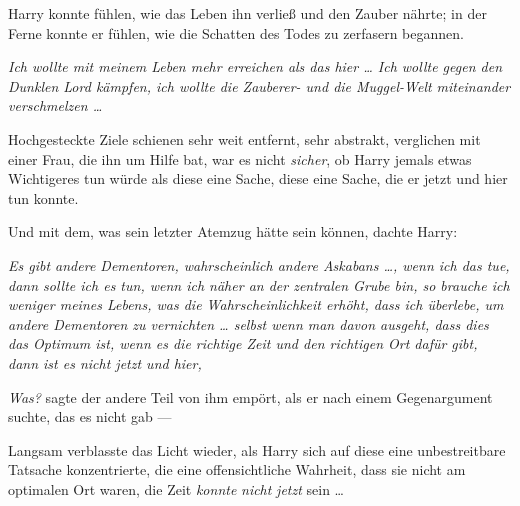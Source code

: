 Harry konnte fühlen, wie das Leben ihn verließ und den Zauber nährte; in der Ferne konnte er fühlen, wie die Schatten des Todes zu zerfasern begannen.

\emph{Ich wollte mit meinem Leben mehr erreichen als das hier … Ich wollte gegen den Dunklen Lord kämpfen, ich wollte die Zauberer- und die Muggel-Welt miteinander verschmelzen …}

Hochgesteckte Ziele schienen sehr weit entfernt, sehr abstrakt, verglichen mit einer Frau, die ihn um Hilfe bat, war es nicht \emph{sicher}, ob Harry jemals etwas Wichtigeres tun würde als diese eine Sache, diese eine Sache, die er jetzt und hier tun konnte.

Und mit dem, was sein letzter Atemzug hätte sein können, dachte Harry:

\emph{Es gibt andere Dementoren, wahrscheinlich andere Askabans …, wenn ich das tue, dann sollte ich es tun, wenn ich näher an der zentralen Grube bin, so brauche ich weniger meines Lebens, was die Wahrscheinlichkeit erhöht, dass ich überlebe, um andere Dementoren zu vernichten … selbst wenn man davon ausgeht, dass dies das Optimum ist, wenn es die richtige Zeit und den richtigen Ort dafür gibt, dann ist es nicht jetzt und hier, }

\emph{Was?} sagte der andere Teil von ihm empört, als er nach einem Gegenargument suchte, das es nicht gab —

Langsam verblasste das Licht wieder, als Harry sich auf diese eine unbestreitbare Tatsache konzentrierte, die eine offensichtliche Wahrheit, dass sie nicht am optimalen Ort waren, die Zeit \emph{konnte} \emph{nicht} \emph{jetzt} sein …


